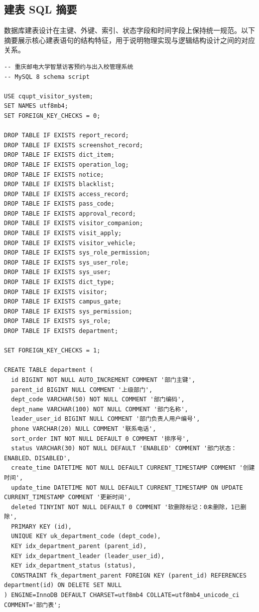 \subsection{建表 SQL 摘要}
数据库建表设计在主键、外键、索引、状态字段和时间字段上保持统一规范。以下摘要展示核心建表语句的结构特征，用于说明物理实现与逻辑结构设计之间的对应关系。
\begin{lstlisting}[style=sqlstyle]
﻿-- 重庆邮电大学智慧访客预约与出入校管理系统
-- MySQL 8 schema script

USE cqupt_visitor_system;
SET NAMES utf8mb4;
SET FOREIGN_KEY_CHECKS = 0;

DROP TABLE IF EXISTS report_record;
DROP TABLE IF EXISTS screenshot_record;
DROP TABLE IF EXISTS dict_item;
DROP TABLE IF EXISTS operation_log;
DROP TABLE IF EXISTS notice;
DROP TABLE IF EXISTS blacklist;
DROP TABLE IF EXISTS access_record;
DROP TABLE IF EXISTS pass_code;
DROP TABLE IF EXISTS approval_record;
DROP TABLE IF EXISTS visitor_companion;
DROP TABLE IF EXISTS visit_apply;
DROP TABLE IF EXISTS visitor_vehicle;
DROP TABLE IF EXISTS sys_role_permission;
DROP TABLE IF EXISTS sys_user_role;
DROP TABLE IF EXISTS sys_user;
DROP TABLE IF EXISTS dict_type;
DROP TABLE IF EXISTS visitor;
DROP TABLE IF EXISTS campus_gate;
DROP TABLE IF EXISTS sys_permission;
DROP TABLE IF EXISTS sys_role;
DROP TABLE IF EXISTS department;

SET FOREIGN_KEY_CHECKS = 1;

CREATE TABLE department (
  id BIGINT NOT NULL AUTO_INCREMENT COMMENT '部门主键',
  parent_id BIGINT NULL COMMENT '上级部门',
  dept_code VARCHAR(50) NOT NULL COMMENT '部门编码',
  dept_name VARCHAR(100) NOT NULL COMMENT '部门名称',
  leader_user_id BIGINT NULL COMMENT '部门负责人用户编号',
  phone VARCHAR(20) NULL COMMENT '联系电话',
  sort_order INT NOT NULL DEFAULT 0 COMMENT '排序号',
  status VARCHAR(30) NOT NULL DEFAULT 'ENABLED' COMMENT '部门状态：ENABLED、DISABLED',
  create_time DATETIME NOT NULL DEFAULT CURRENT_TIMESTAMP COMMENT '创建时间',
  update_time DATETIME NOT NULL DEFAULT CURRENT_TIMESTAMP ON UPDATE CURRENT_TIMESTAMP COMMENT '更新时间',
  deleted TINYINT NOT NULL DEFAULT 0 COMMENT '软删除标记：0未删除，1已删除',
  PRIMARY KEY (id),
  UNIQUE KEY uk_department_code (dept_code),
  KEY idx_department_parent (parent_id),
  KEY idx_department_leader (leader_user_id),
  KEY idx_department_status (status),
  CONSTRAINT fk_department_parent FOREIGN KEY (parent_id) REFERENCES department(id) ON DELETE SET NULL
) ENGINE=InnoDB DEFAULT CHARSET=utf8mb4 COLLATE=utf8mb4_unicode_ci COMMENT='部门表';


\end{lstlisting}
